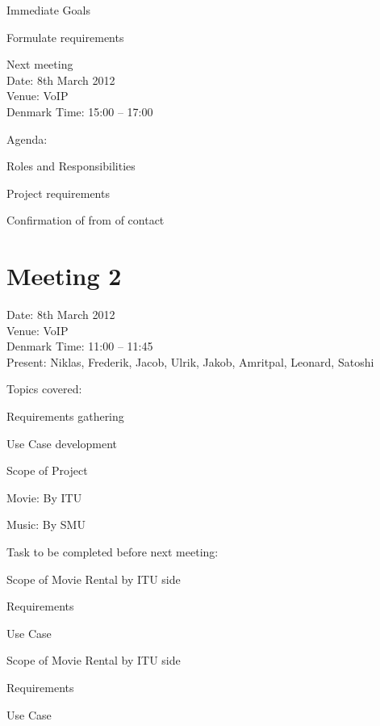 Immediate Goals
\begin{my_itemize}
\item Formulate requirements
\end{my_itemize}

Next meeting\\
Date: 8th March 2012\\
Venue: VoIP\\
 Denmark Time: 15:00 – 17:00
 
Agenda:
\begin{my_itemize}
\item Roles and Responsibilities

\item Project requirements

\item Confirmation of from of contact
\end{my_itemize}

\pagebreak

\section{Meeting 2}
\label{Appendix_SMU_Meeting2}
Date: 8th March 2012\\
Venue: VoIP\\
Denmark Time: 11:00 – 11:45\\
Present: Niklas, Frederik, Jacob, Ulrik, Jakob, Amritpal, Leonard, Satoshi

Topics covered:
 \begin{my_itemize}
\item Requirements gathering

\item Use Case development

\item Scope of Project
	\begin{my_itemize}
	\item Movie: By ITU

	\item Music: By SMU
	\end{my_itemize}

\end{my_itemize}

Task to be completed before next meeting:
\begin {my_itemize}
\item Scope of Movie Rental by ITU side
	\begin{my_itemize}
	\item Requirements

	\item Use Case
	\end{my_itemize}

\item Scope of Movie Rental by ITU side
	\begin{my_itemize}
	\item Requirements

	\item Use Case
	\end{my_itemize}

\end{my_itemize}

